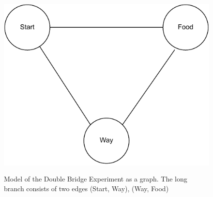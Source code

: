 \begin{figure}[h]
	\begin{centering}
		{\includegraphics[scale=0.5]{figures/background/double_bridge_graph.pdf}}
		\caption[Graph model of Double Bridge]{Model of the Double Bridge Experiment as a graph. The long branch consists of two edges (Start, Way), (Way, Food)}
		\label{fig:double_bridge_graph}
	\end{centering}
\end{figure}
